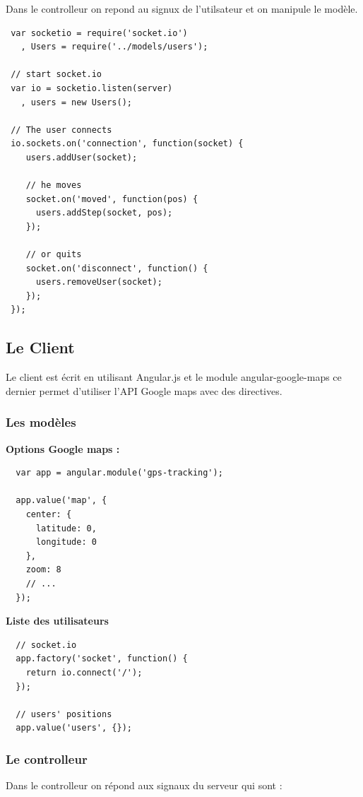\documentclass[a4paper]{article}
\begin{document}
Dans le controlleur on repond au signux de l'utilsateur et on manipule 
le modèle.

\begin{lstlisting}
 var socketio = require('socket.io')
   , Users = require('../models/users');

 // start socket.io
 var io = socketio.listen(server)
   , users = new Users();

 // The user connects
 io.sockets.on('connection', function(socket) {
    users.addUser(socket);
    
    // he moves
    socket.on('moved', function(pos) {
      users.addStep(socket, pos);
    });

    // or quits
    socket.on('disconnect', function() {
      users.removeUser(socket);
    });
 });
\end{lstlisting}

\subsection{Le Client}

Le client est écrit en utilisant Angular.js et le module angular-google-maps
ce dernier permet d'utiliser l'API Google maps avec des directives.

\subsubsection{Les modèles}

\textbf{Options Google maps : }
\begin{lstlisting}
  var app = angular.module('gps-tracking');

  app.value('map', {
    center: {
      latitude: 0,
      longitude: 0
    },
    zoom: 8
    // ...
  });
\end{lstlisting}
\textbf{Liste des utilisateurs}

\begin{lstlisting}
  // socket.io
  app.factory('socket', function() {
    return io.connect('/');
  });

  // users' positions
  app.value('users', {});
\end{lstlisting}

\subsubsection{Le controlleur}

Dans le controlleur on répond aux signaux du serveur qui sont : 
\end{document}
